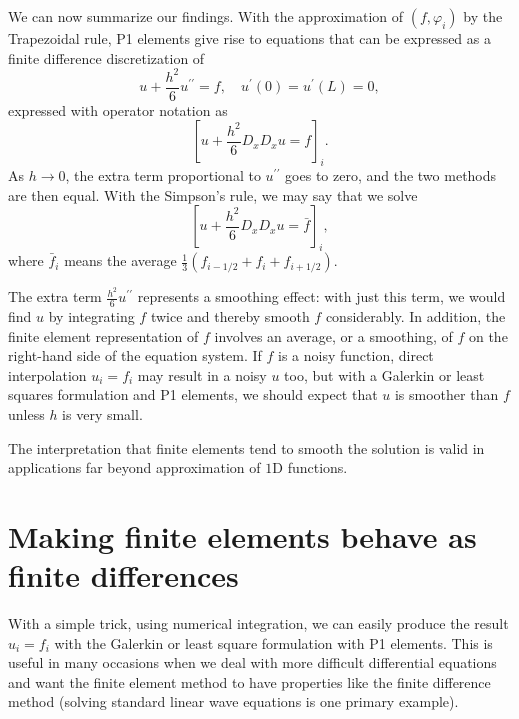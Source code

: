 \documentclass[../main.tex]{subfiles}
\begin{document}
	We can now summarize our findings. With the approximation of $\left(f, \varphi_{i}\right)$ by the Trapezoidal rule, P1 elements give rise to equations that can be expressed as a finite difference discretization of
	\begin{equation}\label{eqa89}
		u+\frac{h^{2}}{6} u^{\prime \prime}=f, \quad u^{\prime}(0)=u^{\prime}(L)=0,
	\end{equation}
	expressed with operator notation as
	\begin{equation}\label{eqa90}
		\left[u+\frac{h^{2}}{6} D_{x} D_{x} u=f\right]_{i}.
	\end{equation}
	As $h \rightarrow 0$, the extra term proportional to $u^{\prime \prime}$ goes to zero, and the two methods are then equal.
	With the Simpson's rule, we may say that we solve
	\begin{equation}\label{eqa91}
		\left[u+\frac{h^{2}}{6} D_{x} D_{x} u=\bar{f}\right]_{i},
	\end{equation}
	where $\bar{f}_{i}$ means the average $\frac{1}{3}\left(f_{i-1 / 2}+f_{i}+f_{i+1 / 2}\right)$.
	
	The extra term $\frac{h^{2}}{6} u^{\prime \prime}$ represents a smoothing effect: with just this term, we would find $u$ by integrating $f$ twice and thereby smooth $f$ considerably. In addition, the finite element representation of $f$ involves an average, or a smoothing, of $f$ on the right-hand side of the equation system. If $f$ is a noisy function, direct interpolation $u_{i}=f_{i}$ may result in a noisy $u$ too, but with a Galerkin or least squares formulation and P1 elements, we should expect that $u$ is smoother than $f$ unless $h$ is very small.
	
	The interpretation that finite elements tend to smooth the solution is valid in applications far beyond approximation of $1 \mathrm{D}$ functions.
	
	\section[Making finite elements behave as finite differences]{Making finite elements behave as finite differences}
	\label{sec:sec_5_3}
	\noindent With a simple trick, using numerical integration, we can easily produce the result $u_{i}=f_{i}$ with the Galerkin or least square formulation with P1 elements. This is useful in many occasions when we deal with more difficult differential equations and want the finite element method to have properties like the finite difference method (solving standard linear wave equations is one primary example).
	
\end{document}
